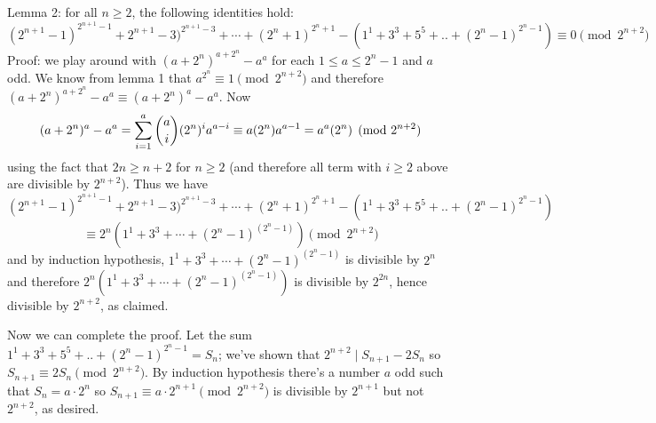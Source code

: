 \documentclass[11pt,a4paper]{article}
\begin{document}
\begin{enumerate}
		Lemma 2: for all $n\ge 2$, the following identities hold: 
		\[
		(2^{n+1} - 1)^{2^{n+1}-1} + 2^{n+1} - 3)^{2^{n+1}-3} + \cdots + (2^n + 1)^{2^n+1} - (1^1 + 3^3 + 5^5 + .. + (2^n - 1)^{2^n-1})\equiv 0\pmod{2^{n+2}}
		\]
		Proof: we play around with $(a+2^n)^{a+2^n}-a^a$ for each $1\le a\le 2^n-1$ and $a$ odd. We know from lemma 1 that $a^{2^n}\equiv 1\pmod{2^{n+2}}$ and therefore $(a+2^n)^{a+2^n}-a^a\equiv (a+2^n)^{a}-a^a$. Now 
		\[
		(a+2^n)^a-a^a=\displaystyle\sum_{i=1}^a \dbinom{a}{i}(2^n)^ia^{a-i}\equiv a(2^n)a^{a-1}=a^a(2^n)\pmod{2^{n+2}}
		\]
		using the fact that $2n\ge n+2$ for $n\ge 2$ (and therefore all term with $i\ge 2$ above are divisible by $2^{n+2}$). Thus we have 
		\[
		(2^{n+1} - 1)^{2^{n+1}-1} + 2^{n+1} - 3)^{2^{n+1}-3} + \cdots + (2^n + 1)^{2^n+1} - (1^1 + 3^3 + 5^5 + .. + (2^n - 1)^{2^n-1})
		\]\[
		\equiv 2^{n}(1^1+3^3+\cdots + (2^n-1)^{(2^n-1)})\pmod{2^{n+2}}
		\]
		and by induction hypothesis, $1^1+3^3+\cdots + (2^n-1)^{(2^n-1)}$ is divisible by $2^n$ and therefore $2^{n}(1^1+3^3+\cdots + (2^n-1)^{(2^n-1)})$ is divisible by $2^{2n}$, hence divisible by $2^{n+2}$, as claimed. 
		
		Now we can complete the proof. Let the sum $1^1 + 3^3 + 5^5 + .. + (2^n - 1)^{2^n-1}=S_n$; we've shown that $2^{n+2}\mid S_{n+1}-2S_n$ so $S_{n+1}\equiv 2S_n\pmod{2^{n+2}}$. By induction hypothesis there's a number $a$ odd such that $S_n=a\cdot 2^{n}$ so $S_{n+1}\equiv a\cdot 2^{n+1}\pmod{2^{n+2}}$ is divisible by $2^{n+1}$ but not $2^{n+2}$, as desired. 
	\end{enumerate}
\end{document}
